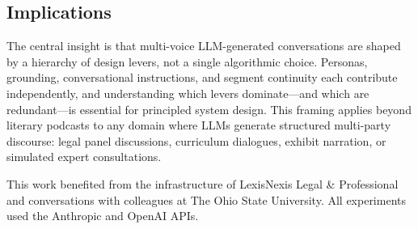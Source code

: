 \documentclass[final]{clv2025}
\begin{document}
\subsection{Implications}

The central insight is that multi-voice LLM-generated conversations
are shaped by a hierarchy of design levers, not a single algorithmic
choice.  Personas, grounding, conversational instructions, and segment
continuity each contribute independently, and understanding which
levers dominate---and which are redundant---is essential for
principled system design.  This framing applies beyond literary
podcasts to any domain where LLMs generate structured multi-party
discourse: legal panel discussions, curriculum dialogues, exhibit
narration, or simulated expert consultations.


\begin{acknowledgments}
This work benefited from the infrastructure of LexisNexis Legal \&
Professional and conversations with colleagues at The Ohio State
University.  All experiments used the Anthropic and OpenAI APIs.
\end{acknowledgments}



\end{document}
